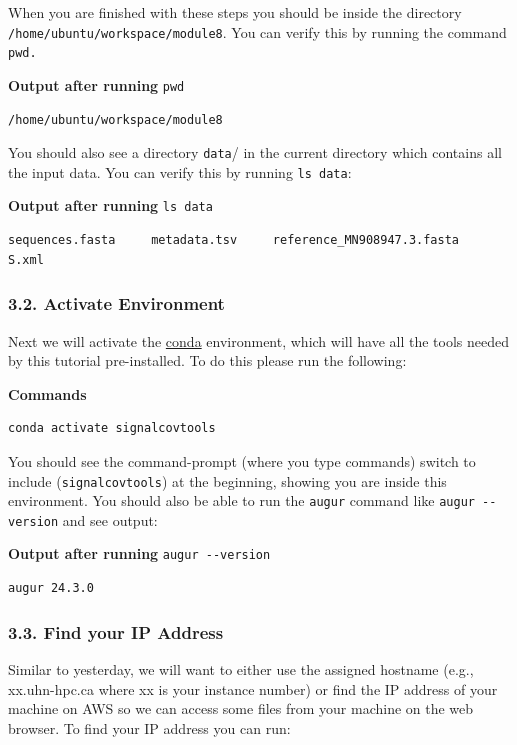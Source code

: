\documentclass[
]{book}
\begin{document}
When you are finished with these steps you should be inside the directory \texttt{/home/ubuntu/workspace/module8}. You can verify this by running the command \texttt{pwd.}

\textbf{Output after running} \texttt{pwd}

\begin{verbatim}
/home/ubuntu/workspace/module8
\end{verbatim}

You should also see a directory \texttt{data}/ in the current directory which contains all the input data. You can verify this by running \texttt{ls\ data}:

\textbf{Output after running} \texttt{ls\ data}

\begin{verbatim}
sequences.fasta     metadata.tsv     reference_MN908947.3.fasta     S.xml
\end{verbatim}

\subsubsection{3.2. Activate Environment}\label{activate-environment}

Next we will activate the \href{https://docs.conda.io/en/latest/}{conda} environment, which will have all the tools needed by this tutorial pre-installed. To do this please run the following:

\textbf{Commands}

\begin{verbatim}
conda activate signalcovtools
\end{verbatim}

You should see the command-prompt (where you type commands) switch to include (\texttt{signalcovtools}) at the beginning, showing you are inside this environment. You should also be able to run the \texttt{augur} command like \texttt{augur\ -\/-version} and see output:

\textbf{Output after running} \texttt{augur\ -\/-version}

\begin{verbatim}
augur 24.3.0
\end{verbatim}

\subsubsection{3.3. Find your IP Address}\label{find-your-ip-address}

Similar to yesterday, we will want to either use the assigned hostname (e.g., xx.uhn-hpc.ca where xx is your instance number) or find the IP address of your machine on AWS so we can access some files from your machine on the web browser. To find your IP address you can run:
\end{document}
